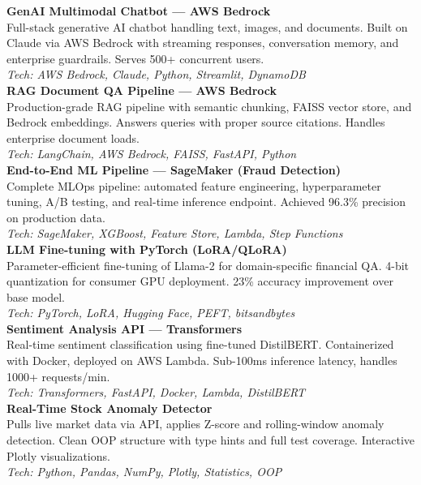 \documentclass[10.5pt,a4paper]{article}
\begin{document}
\textbf{GenAI Multimodal Chatbot --- AWS Bedrock}\\
{\small Full-stack generative AI chatbot handling text, images, and documents. Built on Claude via AWS Bedrock with streaming responses, conversation memory, and enterprise guardrails. Serves 500+ concurrent users.}\\
{\small\color{subtext}\textit{Tech: AWS Bedrock, Claude, Python, Streamlit, DynamoDB}}\\[5pt]

\textbf{RAG Document QA Pipeline --- AWS Bedrock}\\
{\small Production-grade RAG pipeline with semantic chunking, FAISS vector store, and Bedrock embeddings. Answers queries with proper source citations. Handles enterprise document loads.}\\
{\small\color{subtext}\textit{Tech: LangChain, AWS Bedrock, FAISS, FastAPI, Python}}\\[5pt]

\textbf{End-to-End ML Pipeline --- SageMaker (Fraud Detection)}\\
{\small Complete MLOps pipeline: automated feature engineering, hyperparameter tuning, A/B testing, and real-time inference endpoint. Achieved 96.3\% precision on production data.}\\
{\small\color{subtext}\textit{Tech: SageMaker, XGBoost, Feature Store, Lambda, Step Functions}}\\[5pt]

\textbf{LLM Fine-tuning with PyTorch (LoRA/QLoRA)}\\
{\small Parameter-efficient fine-tuning of Llama-2 for domain-specific financial QA. 4-bit quantization for consumer GPU deployment. 23\% accuracy improvement over base model.}\\
{\small\color{subtext}\textit{Tech: PyTorch, LoRA, Hugging Face, PEFT, bitsandbytes}}\\[5pt]

\textbf{Sentiment Analysis API --- Transformers}\\
{\small Real-time sentiment classification using fine-tuned DistilBERT. Containerized with Docker, deployed on AWS Lambda. Sub-100ms inference latency, handles 1000+ requests/min.}\\
{\small\color{subtext}\textit{Tech: Transformers, FastAPI, Docker, Lambda, DistilBERT}}\\[5pt]

\textbf{Real-Time Stock Anomaly Detector}\\
{\small Pulls live market data via API, applies Z-score and rolling-window anomaly detection. Clean OOP structure with type hints and full test coverage. Interactive Plotly visualizations.}\\
{\small\color{subtext}\textit{Tech: Python, Pandas, NumPy, Plotly, Statistics, OOP}}\\[5pt]
\end{document}
